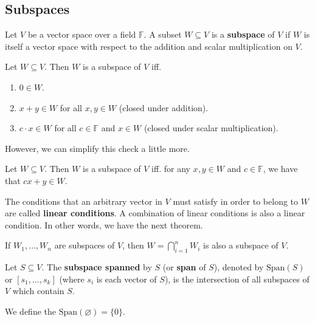 \subsection*{Subspaces}

\begin{definition}[Subspace]
	Let $V$ be a vector space over a field $\mathbb{F}$. A subset $W \subseteq V$ is a \textbf{subspace} of $V$ if $W$ is itself a vector space with respect to the addition and scalar multiplication on $V$.	
\end{definition}

\begin{theorem}
	Let $W \subseteq V$. Then $W$ is a subspace of $V$ iff.
	\begin{enumerate}
		\item $0 \in W$.
		\item $x+y \in W$ for all $x,y \in W$ (closed under addition).
		\item $c \cdot x \in W$ for all $c \in \mathbb{F}$ and $x \in W$ (closed under scalar multiplication).
	\end{enumerate}
\end{theorem}

However, we can simplify this check a little more.

\begin{theorem}
	Let $W \subseteq V$. Then $W$ is a subspace of $V$ iff. for any $x, y \in W$ and $c \in \mathbb{F}$, we have that $cx+y \in W$.
\end{theorem}

The conditions that an arbitrary vector in $V$ must satisfy in order to belong to $W$ are called \textbf{linear conditions}. A combination of linear conditions is also a linear condition. In other words, we have the next theorem.

\begin{theorem}
	If $W_1, \ldots, W_n$ are subspaces of $V$, then $W = \bigcap_{i=1}^n W_i$ is also a subspace of $V$. 
\end{theorem}

\begin{definition}[Span]
	Let $S \subseteq V$. The \textbf{subspace spanned} by $S$ (or \textbf{span} of $S$), denoted by $\text{Span}(S)$ or $[s_1, \ldots, s_k]$ (where $s_i$ is each vector of $S$), is the intersection of all subspaces of $V$ which contain $S$.
	
	We define the $\text{Span}(\varnothing) = \{ 0 \}$.
\end{definition}

